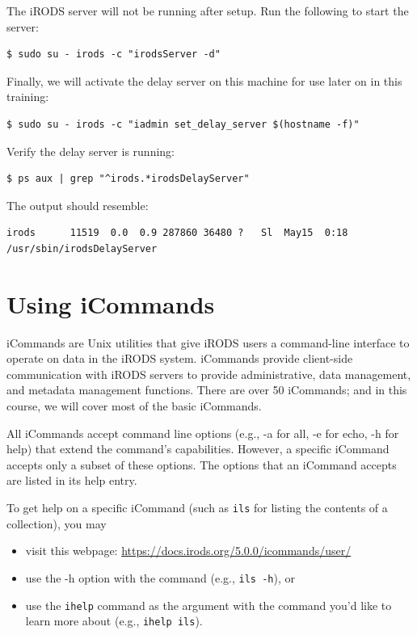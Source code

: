 \documentclass[10pt,oneside]{memoir}
\begin{document}
The iRODS server will not be running after setup. Run the following to start the server:
\begin{lstlisting}
$ sudo su - irods -c "irodsServer -d"
\end{lstlisting}

Finally, we will activate the delay server on this machine for use later on in this training:
\begin{lstlisting}
$ sudo su - irods -c "iadmin set_delay_server $(hostname -f)"
\end{lstlisting}

Verify the delay server is running:
\begin{lstlisting}
$ ps aux | grep "^irods.*irodsDelayServer"
\end{lstlisting}

The output should resemble:
\begin{lstlisting}
irods      11519  0.0  0.9 287860 36480 ?   Sl  May15  0:18 /usr/sbin/irodsDelayServer
\end{lstlisting}

\chapter{Using iCommands}

iCommands are Unix utilities that give iRODS users a command-line interface to operate on data in the iRODS system. iCommands provide client-side communication with iRODS servers to provide administrative, data management, and metadata management functions. There are over 50 iCommands; and in this course, we will cover most of the basic iCommands.

All iCommands accept command line options (e.g., -a for all, -e for echo, -h for help) that extend the command's capabilities. However, a specific iCommand accepts only a subset of these options. The options that an iCommand accepts are listed in its help entry.

To get help on a specific iCommand (such as \texttt{ils} for listing the contents of a collection), you may
\begin{itemize}
 \item visit this webpage: \url{https://docs.irods.org/5.0.0/icommands/user/}
 \item use the -h option with the command (e.g., \texttt{ils -h}), or
 \item use the \texttt{ihelp} command as the argument with the command you'd like to learn more
         about (e.g., \texttt{ihelp ils}).
\end{itemize}
\end{document}
